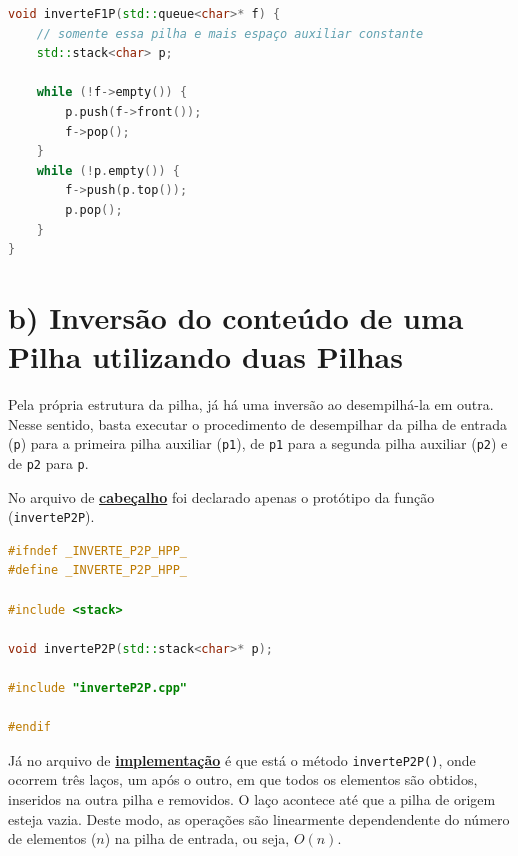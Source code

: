 \documentclass[
  brazilian,
  paper=a4,
  oneside  ,captions=tableheading
]{scrbook}
\newcommand{\passthrough}[1]{#1}
\begin{document}
\begin{lstlisting}[language={C++}]
void inverteF1P(std::queue<char>* f) { 
    // somente essa pilha e mais espaço auxiliar constante
    std::stack<char> p;

    while (!f->empty()) {
        p.push(f->front());
        f->pop();
    }
    while (!p.empty()) {
        f->push(p.top());
        p.pop();
    }
}
\end{lstlisting}

\hypertarget{b-inversuxe3o-do-conteuxfado-de-uma-pilha-utilizando-duas-pilhas}{%
\section{b) Inversão do conteúdo de uma Pilha utilizando duas
Pilhas}\label{b-inversuxe3o-do-conteuxfado-de-uma-pilha-utilizando-duas-pilhas}}

Pela própria estrutura da pilha, já há uma inversão ao desempilhá-la em
outra. Nesse sentido, basta executar o procedimento de desempilhar da
pilha de entrada (\passthrough{\lstinline!p!}) para a primeira pilha
auxiliar (\passthrough{\lstinline!p1!}), de \passthrough{\lstinline!p1!}
para a segunda pilha auxiliar (\passthrough{\lstinline!p2!}) e de
\passthrough{\lstinline!p2!} para \passthrough{\lstinline!p!}.

No arquivo de
\href{https://github.com/ecostadelle/lista_pilhas_filas/blob/main/include/inverteP2P.hpp}{\textbf{cabeçalho}}
foi declarado apenas o protótipo da função
(\passthrough{\lstinline!inverteP2P!}).

\begin{lstlisting}[language={C++}]
#ifndef _INVERTE_P2P_HPP_
#define _INVERTE_P2P_HPP_

#include <stack>

void inverteP2P(std::stack<char>* p);

#include "inverteP2P.cpp"

#endif
\end{lstlisting}

Já no arquivo de
\href{https://github.com/ecostadelle/lista_pilhas_filas/blob/main/include/inverteP2P.cpp}{\textbf{implementação}}
é que está o método \passthrough{\lstinline!inverteP2P()!}, onde ocorrem
três laços, um após o outro, em que todos os elementos são obtidos,
inseridos na outra pilha e removidos. O laço acontece até que a pilha de
origem esteja vazia. Deste modo, as operações são linearmente
dependendente do número de elementos (\(n\)) na pilha de entrada, ou
seja, \(O(n)\).
\end{document}
